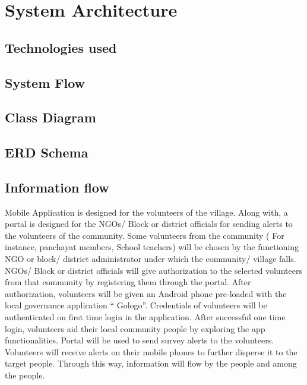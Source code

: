 \chapter{System Architecture}

\section{Technologies used}
\section{System Flow}
\section{Class Diagram}
\section{ERD Schema}
\section{Information flow}
Mobile Application is designed for the volunteers of the village. Along with, a portal is designed for the  NGOs/ Block or district officials for sending alerts to the volunteers of the community. Some volunteers from the community ( For instance, panchayat members, School teachers) will be chosen by the functioning NGO or block/ district administrator under which the community/ village falls. NGOs/ Block or district officials will give authorization to the selected volunteers from that community by registering them through the portal. After authorization, volunteers will be given an Android phone pre-loaded with the local governance application “ Gologo”. Credentials of volunteers will be authenticated on first time login in the application. After successful one time login, volunteers aid their local community people by exploring the app functionalities. Portal will be used to send survey alerts to the volunteers. Volunteers will receive alerts  on their mobile phones to further disperse it to the target people. Through this way, information will flow by the people and  among the people.

